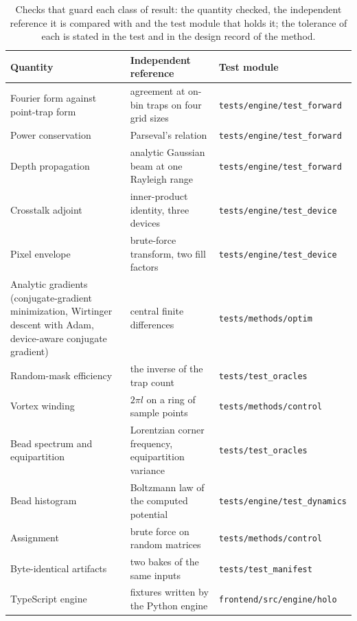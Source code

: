 \begin{table}[t]
\centering\footnotesize
\caption{Checks that guard each class of result: the quantity checked, the independent reference it is compared with and the test module that holds it; the tolerance of each is stated in the test and in the design record of the method.}
\label{tab:validation}
\begin{tabular}{@{}>{\raggedright\arraybackslash}p{} >{\raggedright\arraybackslash}p{} >{\raggedright\arraybackslash}p{}@{}}
\toprule
Quantity & Independent reference & Test module\\
\midrule
Fourier form against point-trap form & agreement at on-bin traps on four grid sizes & \texttt{tests/engine/test\_forward}\\
Power conservation & Parseval's relation & \texttt{tests/engine/test\_forward}\\
Depth propagation & analytic Gaussian beam at one Rayleigh range & \texttt{tests/engine/test\_forward}\\
Crosstalk adjoint & inner-product identity, three devices & \texttt{tests/engine/test\_device}\\
Pixel envelope & brute-force transform, two fill factors & \texttt{tests/engine/test\_device}\\
Analytic gradients (conjugate-gradient minimization, Wirtinger descent with Adam, device-aware conjugate gradient) & central finite differences & \texttt{tests/methods/optim}\\
Random-mask efficiency & the inverse of the trap count & \texttt{tests/test\_oracles}\\
Vortex winding & $2\pi l$ on a ring of sample points & \texttt{tests/methods/control}\\
Bead spectrum and equipartition & Lorentzian corner frequency, equipartition variance & \texttt{tests/test\_oracles}\\
Bead histogram & Boltzmann law of the computed potential & \texttt{tests/engine/test\_dynamics}\\
Assignment & brute force on random matrices & \texttt{tests/methods/control}\\
Byte-identical artifacts & two bakes of the same inputs & \texttt{tests/test\_manifest}\\
TypeScript engine & fixtures written by the Python engine & \texttt{frontend/src/engine/holo}\\
\bottomrule
\end{tabular}
\end{table}

